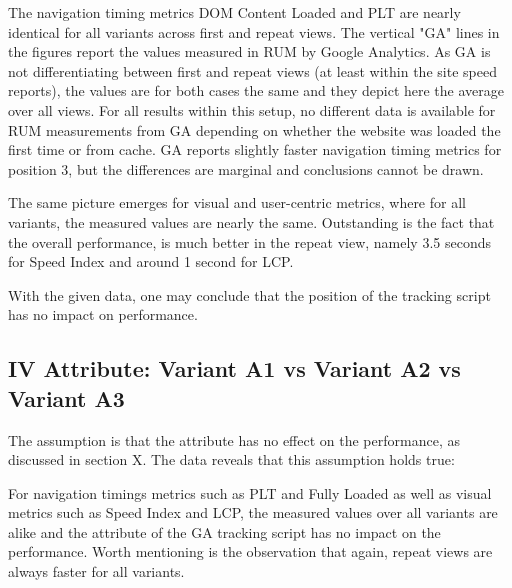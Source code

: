 
The navigation timing metrics DOM Content Loaded and PLT are nearly identical for all variants across first and repeat views.
The vertical "GA" lines in the figures report the values measured in RUM by Google Analytics.
As GA is not differentiating between first and repeat views (at least within the site speed reports), the values are for both cases the same and they depict here the average over all views.
For all results within this setup, no different data is available for RUM measurements from GA depending on whether the website was loaded the first time or from cache.
GA reports slightly faster navigation timing metrics for position 3, but the differences are marginal and conclusions cannot be drawn.


The same picture emerges for visual and user-centric metrics, where for all variants, the measured values are nearly the same.
Outstanding is the fact that the overall performance, is much better in the repeat view, namely 3.5 seconds for Speed Index and around 1 second for LCP.


With the given data, one may conclude that the position of the tracking script has no impact on performance.




\subsection{IV Attribute: Variant A1 vs Variant A2 vs Variant A3}

The assumption is that the attribute has no effect on the performance, as discussed in section X.
The data reveals that this assumption holds true:

For navigation timings metrics such as PLT and Fully Loaded as well as visual metrics such as Speed Index and LCP, the measured values over all variants are alike and the attribute of the GA tracking script has no impact on the performance.
Worth mentioning is the observation that again, repeat views are always faster for all variants.




